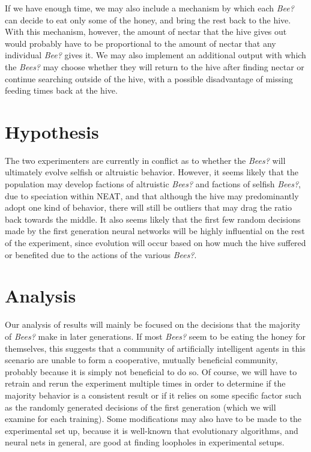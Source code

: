 \documentclass{article}
\begin{document}
	If we have enough time, we may also include a mechanism by which each \emph{Bee?} can decide to eat only some of the honey, and bring the rest back to the hive. With this mechanism, however, the amount of nectar that the hive gives out would probably have to be proportional to the amount of nectar that any individual \emph{Bee?} gives it. We may also implement an additional output with which the \emph{Bees?} may choose whether they will return to the hive after finding nectar or continue searching outside of the hive, with a possible disadvantage of missing feeding times back at the hive.


\section{Hypothesis} %
\label{sec:hypothesis}
	The two experimenters are currently in conflict as to whether the \emph{Bees?} will ultimately evolve selfish or altruistic behavior. However, it seems likely that the population may develop factions of altruistic \emph{Bees?} and factions of selfish \emph{Bees?}, due to speciation within NEAT, and that although the hive may predominantly adopt one kind of behavior, there will still be outliers that may drag the ratio back towards the middle. It also seems likely that the first few random decisions made by the first generation neural networks will be highly influential on the rest of the experiment, since evolution will occur based on how much the hive suffered or benefited due to the actions of the various \emph{Bees?}.


\section{Analysis} %
\label{sec:analysis}
	Our analysis of results will mainly be focused on the decisions that the majority of \emph{Bees?} make in later generations. If most \emph{Bees?} seem to be eating the honey for themselves, this suggests that a community of artificially intelligent agents in this scenario are unable to form a cooperative, mutually beneficial community, probably because it is simply not beneficial to do so. Of course, we will have to retrain and rerun the experiment multiple times in order to determine if the majority behavior is a consistent result or if it relies on some specific factor such as the randomly generated decisions of the first generation (which we will examine for each training). Some modifications may also have to be made to the experimental set up, because it is well-known that evolutionary algorithms, and neural nets in general, are good at finding loopholes in experimental setups.

\end{document}
